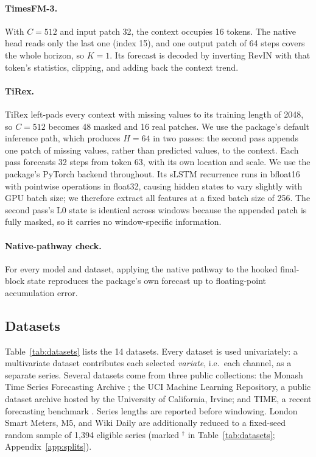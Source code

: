 \documentclass{article} %
\begin{document}
\paragraph{TimesFM-3.} With $C=512$ and input patch 32, the context occupies 16 tokens. The native head reads only the last one (index 15), and one output patch of 64 steps covers the whole horizon, so $K=1$. Its forecast is decoded by inverting RevIN with that token's statistics, clipping, and adding back the context trend.

\paragraph{TiRex.} TiRex left-pads every context with missing values to its training length of 2048, so $C=512$ becomes 48 masked and 16 real patches. We use the package's default inference path, which produces $H=64$ in two passes: the second pass appends one patch of missing values, rather than predicted values, to the context. Each pass forecasts 32 steps from token 63, with its own location and scale. We use the package's PyTorch backend throughout. Its sLSTM recurrence runs in bfloat16 with pointwise operations in float32, causing hidden states to vary slightly with GPU batch size; we therefore extract all features at a fixed batch size of 256. The second pass's L0 state is identical across windows because the appended patch is fully masked, so it carries no window-specific information.

\paragraph{Native-pathway check.} For every model and dataset, applying the native pathway to the hooked final-block state reproduces the package's own forecast up to floating-point accumulation error.

\subsection{Datasets}
\label{app:datasets}

Table~\ref{tab:datasets} lists the 14 datasets. Every dataset is used univariately: a
multivariate dataset contributes each selected \emph{variate}, i.e.\ each channel, as a separate
series. Several datasets come from three public collections: the Monash Time Series
Forecasting Archive \citep{godahewa2021monashtimeseriesforecasting}; the UCI Machine Learning
Repository, a public dataset archive hosted by the University of California, Irvine; and TIME, a
recent forecasting benchmark \citep{qiao2026itstimegenerationtime}. Series lengths are reported
before windowing. London Smart Meters, M5, and Wiki Daily are additionally reduced to a
fixed-seed random sample of 1,394 eligible series (marked $^\dagger$ in
Table~\ref{tab:datasets}; Appendix~\ref{app:splits}).
\end{document}
